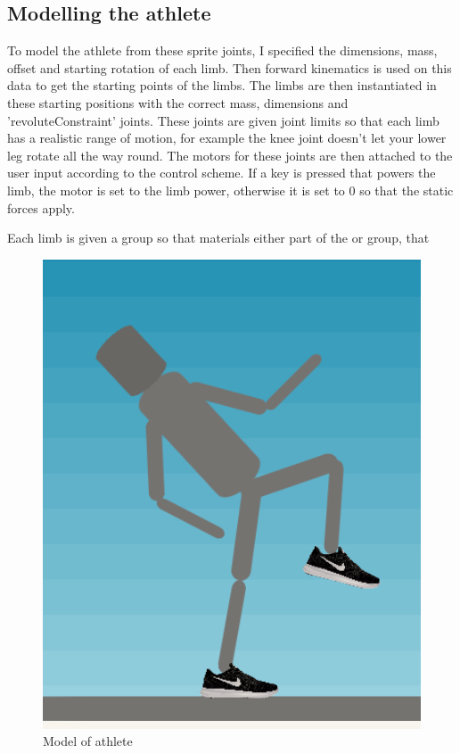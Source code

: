 \documentclass[12pt,a4paper,twoside,openright]{report}
\begin{document}





\subsection{Modelling the athlete}
\label{sec:athleteModel}
To model the athlete from these sprite joints, I specified the dimensions, mass, offset and starting rotation of each limb. Then forward kinematics is used on this data to get the starting points of the limbs. The limbs are then instantiated in these starting positions with the correct mass, dimensions and 'revoluteConstraint' joints. 
These joints are given joint limits so that each limb has a realistic range of motion, for example the knee joint doesn't let your lower leg rotate all the way round.
The motors for these joints are then attached to the user input according to the control scheme. If a key is pressed that powers the limb, the motor is set to the limb power, otherwise it is set to 0 so that the static forces apply.

Each limb is given a group so that materials 
either part of the  or  group, that 

\begin{figure}[tbh]
\centerline{\includegraphics[scale=0.5]{athleteModel.PNG}}
\caption{Model of athlete}
\label{athleteModel}
\end{figure}
\end{document}

